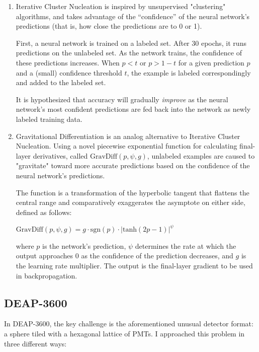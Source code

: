 \documentclass[12pt]{article}
\begin{document}
\begin{enumerate}
    \item Iterative Cluster Nucleation is inspired by unsupervised "clustering" algorithms, and takes advantage of the ``confidence'' of the neural network's predictions (that is, how close the predictions are to 0 or 1).
    
    First, a neural network is trained on a labeled set. After 30 epochs, it runs predictions on the unlabeled set. As the network trains, the confidence of these predictions increases. When $p < t$ or $p > 1 - t$ for a given prediction $p$ and a (small) confidence threshold $t$, the example is labeled correspondingly and added to the labeled set.

    It is hypothesized that accuracy will gradually \textit{improve} as the neural network's most confident predictions are fed back into the network as newly labeled training data.

    \item Gravitational Differentiation is an analog alternative to Iterative Cluster Nucleation. Using a novel piecewise exponential function for calculating final-layer derivatives, called $\mathrm{GravDiff}(p, \psi, g)$, unlabeled examples are caused to "gravitate" toward more accurate predictions based on the confidence of the neural network's predictions.

    The function is a transformation of the hyperbolic tangent that flattens the central range and comparatively exaggerates the asymptote on either side, defined as follows:
    \begin{center}
        $\mathrm{GravDiff}(p, \psi, g) = g \cdot \mathrm{sgn}(p) \cdot \lvert \mathrm{tanh}(2p - 1) \rvert ^ \psi$
    \end{center}
    where $p$ is the network's prediction, $\psi$ determines the rate at which the output approaches 0 as the confidence of the prediction decreases, and $g$ is the learning rate multiplier. The output is the final-layer gradient to be used in backpropagation.
\end{enumerate}

\subsection{DEAP-3600}

In DEAP-3600, the key challenge is the aforementioned unusual detector format: a sphere tiled with a hexagonal lattice of PMTs. I approached this problem in three different ways:
\end{document}

